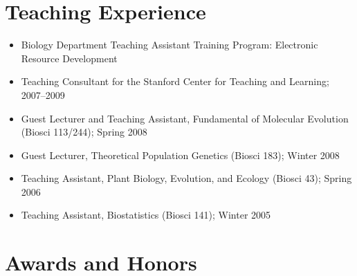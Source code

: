 \documentclass[overlapped,line]{res}
\begin{document}
\begin{resume}

\section{\bf \large Teaching Experience}

\begin{itemize}[$\ast$]
\item Biology Department Teaching Assistant Training Program: Electronic Resource Development
\item Teaching Consultant for the Stanford Center for Teaching and Learning; 2007--2009
\item Guest Lecturer and Teaching Assistant, Fundamental of Molecular Evolution (Biosci 113/244); Spring 2008
\item Guest Lecturer, Theoretical Population Genetics (Biosci 183); Winter 2008
\item Teaching Assistant, Plant Biology, Evolution, and Ecology (Biosci 43); Spring 2006
\item Teaching Assistant, Biostatistics (Biosci 141); Winter 2005
\end{itemize}


\section{\bf \large Awards and Honors}
\vspace{1ex}


\end{resume}
\end{document}
